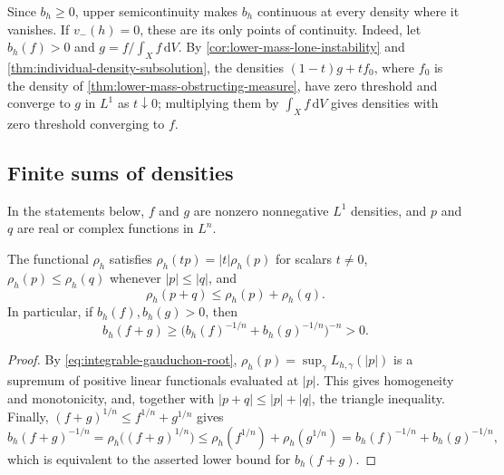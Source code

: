 Since $b_h\geq0$, upper semicontinuity makes $b_h$ continuous at every density where it vanishes. If $v_-(h)=0$, these are its only points of continuity. Indeed, let $b_h(f)>0$ and $g=f/\int_Xf\,\mathrm{d}V$. By \cref{cor:lower-mass-lone-instability} and \cref{thm:individual-density-subsolution}, the densities $(1-t)g+tf_0$, where $f_0$ is the density of \cref{thm:lower-mass-obstructing-measure}, have zero threshold and converge to $g$ in $L^1$ as $t\downarrow0$; multiplying them by $\int_Xf\,\mathrm{d}V$ gives densities with zero threshold converging to $f$.

\subsection{Finite sums of densities}\label{subsec:finite-density-sums}

In the statements below, $f$ and $g$ are nonzero nonnegative $L^1$ densities, and $p$ and $q$ are real or complex functions in $L^n$.

\begin{proposition}\label{prop:individual-root-triangle}
The functional $\rho_h$ satisfies $\rho_h(tp)=|t|\rho_h(p)$ for scalars $t\ne0$,
$\rho_h(p)\leq\rho_h(q)$ whenever $|p|\leq|q|$, and
\[
 \rho_h(p+q)\leq\rho_h(p)+\rho_h(q).
\]
In particular, if $b_h(f),b_h(g)>0$, then
\[
 b_h(f+g)\geq
       \bigl(b_h(f)^{-1/n}+b_h(g)^{-1/n}\bigr)^{-n}>0.
\]
\end{proposition}
\begin{proof}
By \eqref{eq:integrable-gauduchon-root}, $\rho_h(p)=\sup_\gamma L_{h,\gamma}(|p|)$ is a supremum of positive linear functionals evaluated at $|p|$. This gives homogeneity and monotonicity, and, together with $|p+q|\leq|p|+|q|$, the triangle inequality. Finally, $(f+g)^{1/n}\leq f^{1/n}+g^{1/n}$ gives
\[
 b_h(f+g)^{-1/n}=\rho_h\bigl((f+g)^{1/n}\bigr)\leq\rho_h(f^{1/n})+\rho_h(g^{1/n})
 =b_h(f)^{-1/n}+b_h(g)^{-1/n},
\]
which is equivalent to the asserted lower bound for $b_h(f+g)$.
\end{proof}

